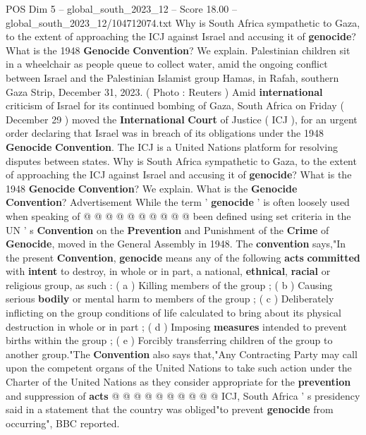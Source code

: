 \begin{textsample}{POS Dim 5 – global\_south\_2023\_12 – Score 18.00 – global\_south\_2023\_12/104712074.txt}  \label{ex:f5_pos_214}
Why is South Africa sympathetic to Gaza, to the extent of approaching the ICJ against Israel and accusing it of \textbf{genocide}?
What is the 1948 \textbf{Genocide} \textbf{Convention}?
We explain.
Palestinian children sit in a wheelchair as people queue to collect water, amid the ongoing conflict between Israel and the Palestinian Islamist group Hamas, in Rafah, southern Gaza Strip, December 31, 2023. ( Photo : Reuters ) Amid \textbf{international} criticism of Israel for its continued bombing of Gaza, South Africa on Friday ( December 29 ) moved the \textbf{International} \textbf{Court} of Justice ( ICJ ), for an urgent order declaring that Israel was in breach of its obligations under the 1948 \textbf{Genocide} \textbf{Convention}.
The ICJ is a United Nations platform for resolving disputes between states.
Why is South Africa sympathetic to Gaza, to the extent of approaching the ICJ against Israel and accusing it of \textbf{genocide}?
What is the 1948 \textbf{Genocide} \textbf{Convention}?
We explain.
What is the \textbf{Genocide} \textbf{Convention}?
Advertisement While the term ' \textbf{genocide} ' is often loosely used when speaking of @ @ @ @ @ @ @ @ @ @ been defined using set criteria in the UN ' s \textbf{Convention} on the \textbf{Prevention} and Punishment of the \textbf{Crime} of \textbf{Genocide}, moved in the General Assembly in 1948.
The \textbf{convention} says,"In the present \textbf{Convention}, \textbf{genocide} means any of the following \textbf{acts} \textbf{committed} with \textbf{intent} to destroy, in whole or in part, a national, \textbf{ethnical}, \textbf{racial} or religious group, as such : ( a ) Killing members of the group ; ( b ) Causing serious \textbf{bodily} or mental harm to members of the group ; ( c ) Deliberately inflicting on the group conditions of life calculated to bring about its physical destruction in whole or in part ; ( d ) Imposing \textbf{measures} intended to prevent births within the group ; ( e ) Forcibly transferring children of the group to another group."The \textbf{Convention} also says that,"Any Contracting Party may call upon the competent organs of the United Nations to take such action under the Charter of the United Nations as they consider appropriate for the \textbf{prevention} and suppression of \textbf{acts} @ @ @ @ @ @ @ @ @ @ ICJ, South Africa ' s presidency said in a statement that the country was obliged"to prevent \textbf{genocide} from occurring", BBC reported.

\end{textsample}
